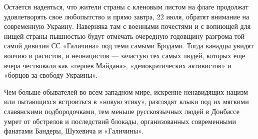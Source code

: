 Остается надеяться, что жители страны с кленовым листом на флаге продолжат
удовлетворять свое любопытство и прямо завтра, 22 июля, обратят внимание на
современную Украину. Наверняка там с военными почестями и с вопиющей для нищей
страны пышностью будут отмечать очередную годовщину разгрома той самой дивизии
СС «Галичина» под теми самыми Бродами. Тогда канадцы увидят воочию и расистов,
и неонацистов --- зачастую тех самых людей, которых еще вчера чествовали как
«героев Майдана», «демократических активистов» и «борцов за свободу Украины».

Чем больше обывателей во всем западном мире, искренне ненавидящих нацизм или
пытающихся встроиться в «новую этику», разглядят клыки под их мягкими
славянскими подбородочками, тем меньше русскоязычных людей в Донбассе умрет от
обстрелов и последствий блокады, организованных современными фанатами Бандеры,
Шухевича и «Галичины».
  
